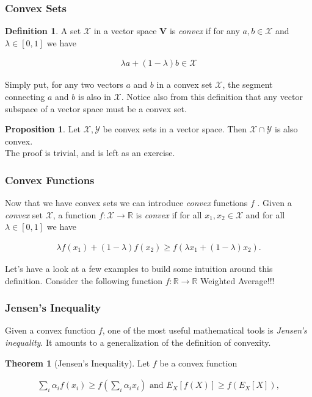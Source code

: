 \documentclass[a4paper,12pt]{article}
\theoremstyle{definition}
\newtheorem*{definition}{Definition}
\newtheorem*{proposition}{Proposition}
\newtheorem*{theorem}{Theorem}
\newcommand{\R}{\mathbb{R}}
\begin{document}
\subsubsection*{Convex Sets}
\begin{definition}
    A set $\mathcal{X}$ in a vector space $\mathbf{V}$ is \emph{convex} if for any $a,b \in \mathcal{X}$ and $\lambda \in [0, 1]$ we have

    \begin{align*}
        \lambda  a + (1-\lambda)  b \in \mathcal{X}
    \end{align*}

\end{definition}

Simply put, for any two vectors $a$ and $b$ in a convex set $\mathcal{X}$, the segment connecting $a$ and $b$ is also in $\mathcal{X}$.
Notice also from this definition that any vector subspace of a vector space must be a convex set.

\begin{proposition}
    Let $\mathcal{X}, \mathcal{Y}$ be convex sets in a vector space. Then $\mathcal{X} \cap \mathcal{Y}$ is also convex.
    \\[6pt]
    The proof is trivial, and is left as an exercise.
\end{proposition}


\subsubsection*{Convex Functions}

Now that we have convex sets we can introduce \emph{convex} functions $f$ . Given a \emph{convex} set $\mathcal{X}$, a function $f: \mathcal{X} \to \mathbb{R}$ is \emph{convex} if for all
$x_1, x_2 \in \mathcal{X}$ and for all $\lambda \in [0, 1]$ we have

\begin{align*}
    \lambda f(x_1) + (1-\lambda) f(x_2) \geq f(\lambda x_1 + (1-\lambda) x_2).
\end{align*}


Let's have a look at a few examples to build some intuition around this definition.
Consider the following function $f : \R \to \R$
Weighted Average!!!

\subsubsection*{Jensen's Inequality}
Given a convex function $f$, one of the most useful mathematical tools is \emph{Jensen's inequality}. It amounts to a generalization of the definition of convexity.
\begin{theorem}[Jensen's Inequality]
    Let $f$ be a convex function

    \begin{align*}
        \sum_i \alpha_i f(x_i)  \geq f\left(\sum_i \alpha_i x_i\right)    \text{ and }    E_X[f(X)]  \geq f\left(E_X[X]\right),
    \end{align*}

\end{theorem}
\end{document}
